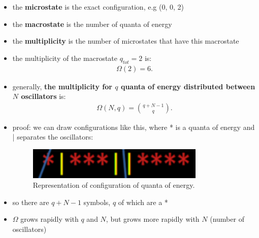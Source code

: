 \documentclass[10pt]{article}
\begin{document}
\begin{itemize}
\begin{figure}[h!]
            \label{fig:quantumOscillatorsArrangement}
        \end{figure}
    \item the \textbf{microstate} is the exact configuration, e.g (0, 0, 2)
    \item the \textbf{macrostate} is the number of quanta of energy
    \item the \textbf{multiplicity} is the number of microstates that have this macrostate
    \item the multiplicity of the macrostate $q_{tot} = 2$ is:
        \begin{align*}
            \Omega(2) = 6
        .\end{align*}
    \item generally, \textbf{the multiplicity for $q$ quanta of energy distributed between $N$ oscillators} is:
        \begin{align*}
            \Omega(N,q) = {q+N-1 \choose q}
        .\end{align*}
    \item proof: we can draw configurations like this, where * is a quanta of energy and | separates the oscillators:
        \begin{figure}[h!]
            \centering
            \includegraphics[width=0.8\textwidth]{multiplicityEinsteinProof}
            \caption{Representation of configuration of quanta of energy.}
            \label{fig:multiplicityEinsteinProof}
        \end{figure}
    \item so there are $q+N-1$ symbols, $q$ of which are a *
    \item $\Omega$ grows rapidly with $q$ and $N$, but grows more rapidly with $N$ (number of oscillators)
\end{itemize}
\end{document}
